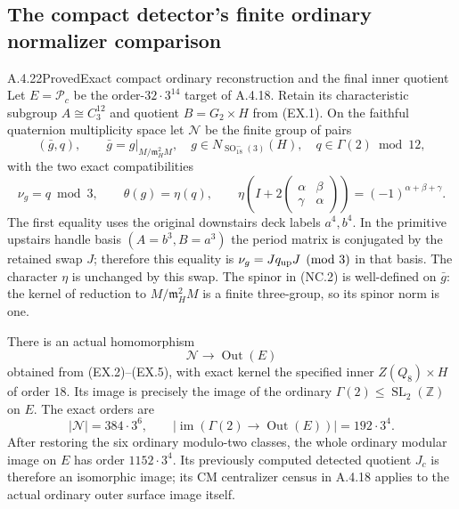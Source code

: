 \subsection{The compact detector's finite ordinary normalizer comparison}

\begin{result}{A.4.22}{Proved}{Exact compact ordinary reconstruction and the final inner quotient}
Let $E=\mathcal P_c$ be the order-$32\cdot3^{14}$ target
of A.4.18.  Retain its characteristic subgroup
$A\cong C_3^{12}$ and quotient $B=G_2\times H$ from
(EX.1).  On the faithful quaternion multiplicity space
let $\mathscr N$ be the finite group of pairs
\[
 (\bar g,q),\qquad
 \bar g= g|_{M/\mathfrak m_H^2M},\quad
 g\in N_{\operatorname{SO}_{18}^-(3)}(H),\quad
 q\in\Gamma(2)\bmod12,
                                                        \tag{NC.1}
\]
with the two exact compatibilities
\[
 \nu_g=q\bmod3,
 \qquad \theta(g)=\eta(q),\qquad
 \eta\!\left(I+2\begin{pmatrix}\alpha&\beta\\
                         \gamma&\alpha\end{pmatrix}\right)
       =(-1)^{\alpha+\beta+\gamma}.                     \tag{NC.2}
\]
The first equality uses the original downstairs deck
labels $a^4,b^4$.  In the primitive upstairs handle
basis $(A=b^3,B=a^3)$ the period matrix is conjugated
by the retained swap $J$; therefore this equality
is $\nu_g=Jq_{\rm up}J\pmod3$ in that basis.
The character $\eta$ is unchanged by this swap.
The spinor in (NC.2) is well-defined on $\bar g$:
the kernel of reduction to $M/\mathfrak m_H^2M$
is a finite three-group, so its spinor norm is one.

There is an actual homomorphism
\[
 \mathscr N\longrightarrow\operatorname{Out}(E)
                                                        \tag{NC.3}
\]
obtained from (EX.2)--(EX.5), with exact kernel the
specified inner $Z(Q_8)\times H$ of order $18$.
Its image is precisely the image of the ordinary
$\Gamma(2)\leq\operatorname{SL}_2(\mathbb Z)$ on $E$.
The exact orders are
\[
 |\mathscr N|=384\cdot3^6,
 \qquad |\operatorname{im}(\Gamma(2)\to
                   \operatorname{Out}(E))|=192\cdot3^4.
                                                        \tag{NC.4}
\]
After restoring the six ordinary modulo-two classes,
the whole ordinary modular image on $E$ has order
$1152\cdot3^4$.  Its previously computed detected
quotient $J_c$ is therefore an isomorphic image;
its CM centralizer census in A.4.18 applies to the
actual ordinary outer surface image itself.
\end{result}

